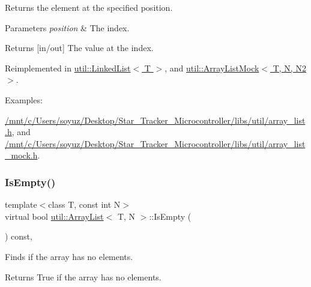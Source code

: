 Returns the element at the specified position. 


\begin{DoxyParams}{Parameters}
{\em position} & The index. \\
\hline
\end{DoxyParams}
\begin{DoxyReturn}{Returns}
\mbox{[}in/out\mbox{]} The value at the index. 
\end{DoxyReturn}


Reimplemented in \hyperlink{classutil_1_1LinkedList_ad3586e05f1b6f9d6b4cebba91433a2e7}{util\+::\+Linked\+List$<$ T $>$}, and \hyperlink{classutil_1_1ArrayListMock_a84e20a60cd0268edafb36b88c0895b71}{util\+::\+Array\+List\+Mock$<$ T, N, N2 $>$}.

\begin{Desc}
\item[Examples\+: ]\par
\hyperlink{_2mnt_2c_2Users_2soyuz_2Desktop_2Star_Tracker_Microcontroller_2libs_2util_2array_list_8h-example}{/mnt/c/\+Users/soyuz/\+Desktop/\+Star\+\_\+\+Tracker\+\_\+\+Microcontroller/libs/util/array\+\_\+list.\+h}, and \hyperlink{_2mnt_2c_2Users_2soyuz_2Desktop_2Star_Tracker_Microcontroller_2libs_2util_2array_list_mock_8h-example}{/mnt/c/\+Users/soyuz/\+Desktop/\+Star\+\_\+\+Tracker\+\_\+\+Microcontroller/libs/util/array\+\_\+list\+\_\+mock.\+h}.\end{Desc}
\mbox{\label{classutil_1_1ArrayList_a8e33bd4f9e6a67140696cf24b8cc66b1}} 
\subsubsection{\texorpdfstring{Is\+Empty()}{IsEmpty()}}
{\footnotesize\ttfamily template$<$class T, const int N$>$ \\
virtual bool \hyperlink{classutil_1_1ArrayList}{util\+::\+Array\+List}$<$ T, N $>$\+::Is\+Empty (\begin{DoxyParamCaption}{ }\end{DoxyParamCaption}) const\hspace{0.3cm}{\ttfamily [inline]}, {\ttfamily [virtual]}}



Finds if the array has no elements. 

\begin{DoxyReturn}{Returns}
True if the array has no elements. 
\end{DoxyReturn}


